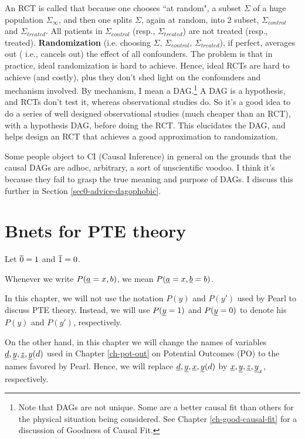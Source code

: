 An RCT is called that 
because one chooses
``at random", a subset $\Sigma$
of a huge population
$\Sigma_\infty$,
and then one 
splits $\Sigma$,
again at random, into 2
subset, $\Sigma_{control}$ and $\Sigma_{treated}$.
All patients in 
$\Sigma_{control}$ (resp., 
$\Sigma_{treated}$) are not treated
(resp., treated).
{\bf Randomization}
(i.e. choosing $\Sigma$,
$\Sigma_{control}$, $\Sigma_{treated}$), if perfect, averages out (
i.e., cancels out) 
the effect of all confounders. The problem is that in practice, ideal randomization is hard to achieve. Hence, ideal RCTs are hard to achieve (and costly), plus they don't shed light on the confounders and mechanism involved.
By  mechanism, I mean a DAG.\footnote{Note
that DAGs are not unique. Some are a better causal fit than others
for the 
physical
situation
being considered. See Chapter \ref{ch-good-causal-fit}
for a discussion of Goodness of Causal Fit.}
 A DAG is a hypothesis, and RCTs don't test it, whereas observational studies do.
So it's a good
idea to do a series of well designed observational studies (much cheaper than an RCT), with a hypothesis DAG, before doing the RCT. This
elucidates the DAG, 
and helps design an RCT that achieves a good approximation to randomization.

Some people object to  CI (Causal Inference) in general on the
grounds that the causal DAGs
 are adhoc, arbitrary, a
sort of unscientific voodoo. I think it’s because they fail to grasp the
true meaning
and purpose of DAGs.
I discuss this further
in Section \ref{sec0-advice-dagophobic}.






\section{Bnets for PTE theory}
\quad

Let $\overline{0}=1$ and $\overline{1}=0$.

Whenever we write $P({\underline{a}}=x, b)$,
we mean $P({\underline{a}}=x, {\underline{b}}=b)$.

In this chapter, we will
not use the notation
$P(y)$ and $P(y')$
used by Pearl to
discuss PTE theory.
Instead, we will
use $P({\underline{y}}=1)$ and
$P({\underline{y}}=0)$
to denote his
$P(y)$ and $P(y')$, respectively.


On the other hand,
in this chapter
we will change the names
of variables ${\underline{d}}, {\underline{y}}, {\underline{z}}, {\underline{y}}(d)$
used
in Chapter \ref{ch-pot-out} on Potential
Outcomes (PO)
to the names favored by Pearl.
Hence, we will replace
${\underline{d}}, {\underline{y}}, {\underline{x}}, {\underline{y}}(d)$
by
${\underline{x}}, {\underline{y}}, {\underline{z}}, {\underline{y}}_x$,
respectively.




